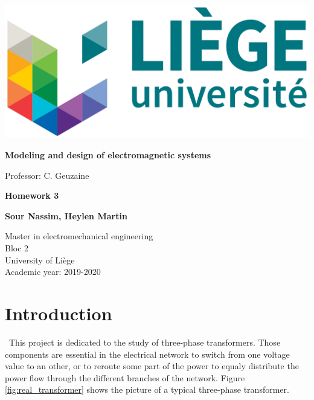 \documentclass[12pt,a4paper]{report}
\begin{document}
\begin{titlepage}

\centering
\includegraphics[scale=0.25]{logo_ulg.png}%

\begin{center}\bfseries\huge
\vspace*{1cm}
Modeling and design of electromagnetic systems
\end{center}

\begin{center}\normalsize
Professor: C. Geuzaine\\
\end{center}

\hrulefill
\begin{center}\bfseries\Huge
Homework 3 
\end{center}

\hrulefill
\vspace*{1cm}
\begin{center}\bfseries\Large
Sour Nassim, Heylen Martin
\end{center}

\begin{center}\bfseries\large

Master in electromechanical engineering\\ Bloc 2 \\
University of Liège \\
Academic year: 2019-2020
\end{center}
\begin{flushright}

\end{flushright} 

\end{titlepage}
\chapter{Introduction}
\quad\, This project is dedicated to the study of three-phase transformers. Those components are essential in the electrical network to switch from one voltage value to an other, or to reroute some part of the power to equaly distribute the power flow through the different branches of the network. Figure \ref{fig:real_transformer} shows the picture of a typical three-phase transformer.
\end{document}
